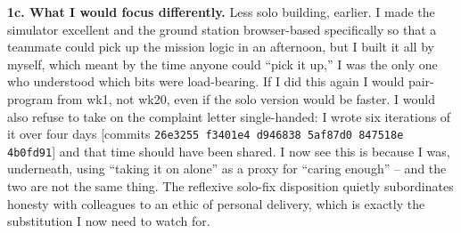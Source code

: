 \textbf{1c. What I would focus differently.}  Less solo building, earlier. I made the simulator excellent and the ground station browser-based specifically so that a teammate could pick up the mission logic in an afternoon, but I built it all by myself, which meant by the time anyone could ``pick it up,'' I was the only one who understood which bits were load-bearing. If I did this again I would pair-program from wk1, not wk20, even if the solo version would be faster. I would also refuse to take on the complaint letter single-handed: I wrote six iterations of it over four days [commits \texttt{26e3255 f3401e4 d946838 5af87d0 847518e 4b0fd91}] and that time should have been shared. I now see this is because I was, underneath, using ``taking it on alone'' as a proxy for ``caring enough'' -- and the two are not the same thing. The reflexive solo-fix disposition quietly subordinates honesty with colleagues to an ethic of personal delivery, which is exactly the substitution I now need to watch for.
